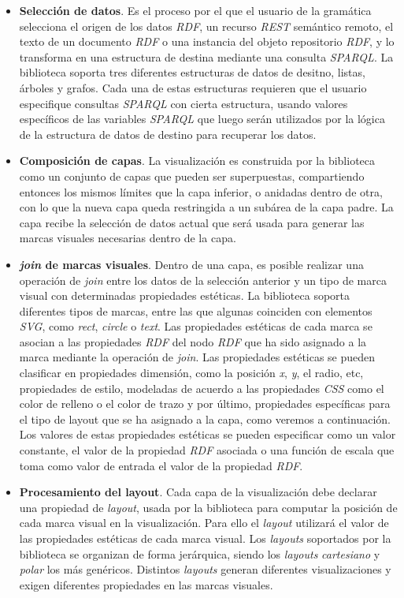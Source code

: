 \begin{itemize}
\item \textbf{Selecci\'on de datos}. Es el proceso por el que el usuario de la gram\'atica selecciona el origen de los datos \textit{RDF}, un recurso \textit{REST} sem\'antico remoto, el texto de un documento \textit{RDF} o una instancia del objeto repositorio \textit{RDF}, y lo transforma en una estructura de destina mediante una consulta \textit{SPARQL}. La biblioteca soporta tres diferentes estructuras de datos de desitno, listas, \'arboles y grafos. Cada una de estas estructuras requieren que el usuario especifique consultas \textit{SPARQL} con cierta estructura, usando valores espec\'ificos de las variables \textit{SPARQL} que luego ser\'an utilizados por la l\'ogica de la estructura de datos de destino para recuperar los datos.
\item \textbf{Composici\'on de capas}. La visualizaci\'on es construida por la biblioteca como un conjunto de capas que pueden ser superpuestas, compartiendo entonces los mismos l\'imites que la capa inferior,  o anidadas dentro de otra, con lo que la nueva capa queda restringida a un sub\'area de la capa padre. La capa recibe la selecci\'on de datos actual que ser\'a usada para generar las marcas visuales necesarias dentro de la capa.
\item \textbf{\textit{join} de marcas visuales}. Dentro de una capa, es posible realizar una operaci\'on de \textit{join} entre  los datos de la selecci\'on anterior y un tipo de marca visual con determinadas propiedades est\'eticas. La biblioteca soporta diferentes tipos de marcas, entre las que algunas coinciden con elementos \textit{SVG}, como \textit{rect}, \textit{circle} o \textit{text}. Las propiedades est\'eticas de cada marca se asocian a las propiedades \textit{RDF} del nodo \textit{RDF} que ha sido asignado a la marca mediante la operaci\'on de \textit{join}. Las propiedades est\'eticas se pueden clasificar en propiedades dimensi\'on, como la posici\'on \textit{x}, \textit{y}, el radio, etc, propiedades de estilo, modeladas de acuerdo a las propiedades \textit{CSS} como el color de relleno o el color de trazo y por \'ultimo, propiedades espec\'ificas para el tipo de layout que se ha asignado a la capa, como veremos a continuaci\'on. Los valores de estas propiedades est\'eticas se pueden especificar como un valor constante, el valor de la propiedad \textit{RDF} asociada o una funci\'on de escala que toma como valor de entrada el valor de la propiedad \textit{RDF}.
\item \textbf{Procesamiento del layout}. Cada capa de la visualizaci\'on debe declarar una propiedad de \textit{layout}, usada por la biblioteca para computar la posici\'on de cada marca visual en la visualizaci\'on. Para ello el \textit{layout} utilizar\'a el valor de las propiedades est\'eticas de cada marca visual. Los \textit{layouts} soportados por la biblioteca se organizan de forma jer\'arquica, siendo los \textit{layouts} \textit{cartesiano} y \textit{polar} los m\'as gen\'ericos. Distintos \textit{layouts} generan diferentes visualizaciones y exigen diferentes propiedades en las marcas visuales.
\end{itemize}

